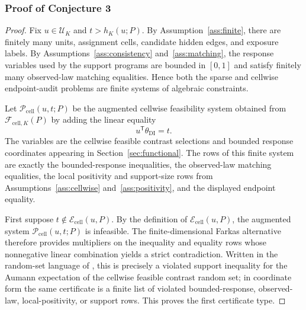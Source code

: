 \documentclass[11pt]{article}
\newcommand{\transpose}{\mathsf{T}}
\theoremstyle{definition}
\theoremstyle{plain}
\theoremstyle{remark}
\begin{document}
\subsubsection*{Proof of Conjecture 3}
\begin{proof}
Fix \(u\in\mathcal U_K\) and \(t>h_K(u;P)\).  By Assumption~\ref{ass:finite}, there are finitely many units, assignment cells, candidate hidden edges, and exposure labels.  By Assumptions~\ref{ass:consistency} and~\ref{ass:matching}, the response variables used by the support programs are bounded in \([0,1]\) and satisfy finitely many observed-law matching equalities.  Hence both the sparse and cellwise endpoint-audit problems are finite systems of algebraic constraints.

Let \(\mathcal P_{\mathrm{cell}}(u,t;P)\) be the augmented cellwise feasibility system obtained from \(\mathcal F_{\mathrm{cell},K}(P)\) by adding the linear equality
\[
u^\transpose\theta_{\mathrm{DI}}=t.
\]
The variables are the cellwise feasible contrast selections and bounded response coordinates appearing in Section~\ref{sec:functional}.  The rows of this finite system are exactly the bounded-response inequalities, the observed-law matching equalities, the local positivity and support-size rows from Assumptions~\ref{ass:cellwise} and~\ref{ass:positivity}, and the displayed endpoint equality.

First suppose \(t\notin\mathcal E_{\mathrm{cell}}(u,P)\).  By the definition of \(\mathcal E_{\mathrm{cell}}(u,P)\), the augmented system \(\mathcal P_{\mathrm{cell}}(u,t;P)\) is infeasible.  The finite-dimensional Farkas alternative therefore provides multipliers on the inequality and equality rows whose nonnegative linear combination yields a strict contradiction.  Written in the random-set language of \cite{BeresteanuMolchanovMolinari2011}, this is precisely a violated support inequality for the Aumann expectation of the cellwise feasible contrast random set; in coordinate form the same certificate is a finite list of violated bounded-response, observed-law, local-positivity, or support rows.  This proves the first certificate type.


\end{proof}
\end{document}
